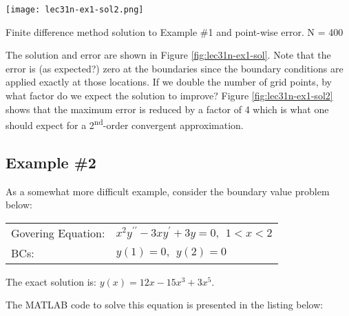 \begin{marginfigure}[-2.0cm]
\texttt{[image: lec31n-ex1-sol2.png]}
\caption{Finite difference method solution to Example \#1 and point-wise error. N = 400}
\label{fig:lec31n-ex1-sol2}
\end{marginfigure}
The solution and error are shown in Figure \ref{fig:lec31n-ex1-sol}. Note that the error is (as expected?) zero at the boundaries since the boundary conditions are applied exactly at those locations.  If we double the number of grid points, by what factor do we expect the solution to improve?  Figure \ref{fig:lec31n-ex1-sol2} shows that the maximum error is reduced by a factor of 4 which is what one should expect for a 2\textsuperscript{nd}-order convergent approximation.   


\subsection{Example \#2}
As a somewhat more difficult example, consider the boundary value problem below:

\begin{table}
\begin{tabular}{l l}
Govering Equation: & $x^2y^{\prime \prime} - 3xy^{\prime} + 3y = 0, \ \ 1 < x < 2$ \\
BCs: & $y(1) = 0, \ \ y(2) = 0$ \\
\end{tabular}
\end{table}

\vspace{0.25cm}

\noindent The exact solution is: $y(x) = 12x-15x^3 + 3x^5$.

The MATLAB code to solve this equation is presented in the listing below:

